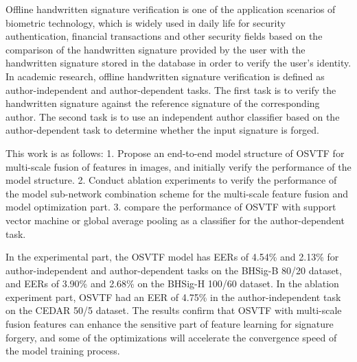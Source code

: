 Offline handwritten signature verification is one of the application scenarios of biometric technology, which is widely used in daily life for security authentication, financial transactions and other security fields based on the comparison of the handwritten signature provided by the user with the handwritten signature stored in the database in order to verify the user's identity. In academic research, offline handwritten signature verification is defined as author-independent and author-dependent tasks. The first task is to verify the handwritten signature against the reference signature of the corresponding author. The second task is to use an independent author classifier based on the author-dependent task to determine whether the input signature is forged.

This work is as follows: 1. Propose an end-to-end model structure of OSVTF for multi-scale fusion of features in images, and initially verify the performance of the model structure. 2. Conduct ablation experiments to verify the performance of the model sub-network combination scheme for the multi-scale feature fusion and model optimization part. 3. compare the performance of OSVTF with support vector machine or global average pooling as a classifier for the author-dependent task.

In the experimental part, the OSVTF model has EERs of 4.54\% and 2.13\% for author-independent and author-dependent tasks on the BHSig-B 80/20 dataset, and EERs of 3.90\% and 2.68\% on the BHSig-H 100/60 dataset. In the ablation experiment part, OSVTF had an EER of 4.75\% in the author-independent task on the CEDAR 50/5 dataset. The results confirm that OSVTF with multi-scale fusion features can enhance the sensitive part of feature learning for signature forgery, and some of the optimizations will accelerate the convergence speed of the model training process.





